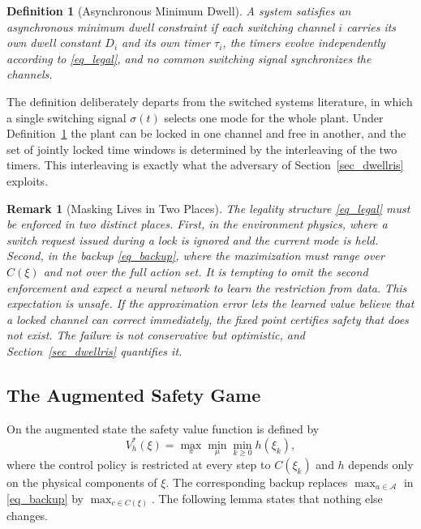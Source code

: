 \documentclass[journal]{IEEEtran}
\newtheorem{definition}{Definition}
\newtheorem{remark}{Remark}
\begin{document}
\begin{definition}[Asynchronous Minimum Dwell]\label{def_async}
A system satisfies an asynchronous minimum dwell constraint if each switching channel $i$ carries its own dwell constant $D_i$ and its own timer $\tau_i$, the timers evolve independently according to \eqref{eq_legal}, and no common switching signal synchronizes the channels.
\end{definition}

The definition deliberately departs from the switched systems literature, in which a single switching signal $\sigma(t)$ selects one mode for the whole plant. Under Definition~\ref{def_async} the plant can be locked in one channel and free in another, and the set of jointly locked time windows is determined by the interleaving of the two timers. This interleaving is exactly what the adversary of Section~\ref{sec_dwellris} exploits.

\begin{remark}[Masking Lives in Two Places]\label{rem_masking}
The legality structure \eqref{eq_legal} must be enforced in two distinct places. First, in the environment physics, where a switch request issued during a lock is ignored and the current mode is held. Second, in the backup \eqref{eq_backup}, where the maximization must range over $C(\xi)$ and not over the full action set. It is tempting to omit the second enforcement and expect a neural network to learn the restriction from data. This expectation is unsafe. If the approximation error lets the learned value believe that a locked channel can correct immediately, the fixed point certifies safety that does not exist. The failure is not conservative but optimistic, and Section~\ref{sec_dwellris} quantifies it.
\end{remark}

\subsection{The Augmented Safety Game}

On the augmented state the safety value function is defined by
\begin{equation}
V_h^{*}(\xi) = \max_{\pi} \min_{\mu} \min_{k \ge 0} h(\xi_k),
\label{eq_value_aug}
\end{equation}
where the control policy is restricted at every step to $C(\xi_k)$ and $h$ depends only on the physical components of $\xi$. The corresponding backup replaces $\max_{a \in \mathcal{A}}$ in \eqref{eq_backup} by $\max_{c \in C(\xi)}$. The following lemma states that nothing else changes.
\end{document}
